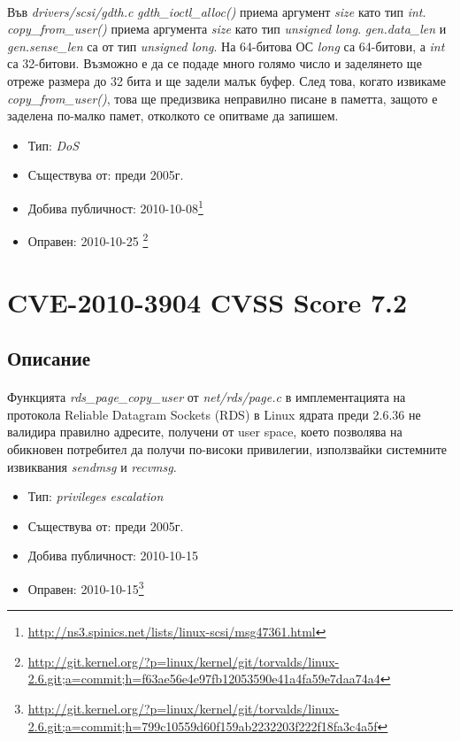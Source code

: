 \documentclass[a4paper,12pt,leqno]{article}
\begin{document}
\paragraph{}
Във \textit{drivers/scsi/gdth.c}
\textit{gdth\_ioctl\_alloc()} приема аргумент \textit{size} като тип \textit{int}.
\textit{copy\_from\_user()} приема аргумента \textit{size} като тип \textit{unsigned long}.
\textit{gen.data\_len} и \textit{gen.sense\_len} са от тип \textit{unsigned long}.
На 64-битова ОС \textit{long} са 64-битови, а \textit{int} са 32-битови.
Възможно е да се подаде много голямо число и заделянето ще отреже размера до 32 бита
и ще задели малък буфер. След това, когато извикаме \textit{copy\_from\_user()},
това ще предизвика неправилно писане в паметта, защото е заделена по-малко памет,
отколкото се опитваме да запишем.
\begin{itemize}
    \item Тип: \textit{DoS}
    \item Съществува от: преди 2005г.
  	\item Добива публичност: 2010-10-08\footnote{\url{http://ns3.spinics.net/lists/linux-scsi/msg47361.html}}
    \item Оправен: 2010-10-25 \footnote{\url{http://git.kernel.org/?p=linux/kernel/git/torvalds/linux-2.6.git;a=commit;h=f63ae56e4e97fb12053590e41a4fa59e7daa74a4}}
\end{itemize}





\section{CVE-2010-3904 CVSS Score 7.2}
\subsection{Описание}
\paragraph{}
Функцията \textit{rds\_page\_copy\_user} от  \textit{net/rds/page.c} в имплементацията на протокола Reliable Datagram Sockets (RDS) в Linux ядрата преди 2.6.36 не валидира правилно адресите, получени от user space, което позволява на обикновен потребител да получи по-високи привилегии, използвайки системните извиквания \textit{sendmsg} и \textit{recvmsg}.
\begin{itemize}
    \item Тип: \textit{privileges escalation}
    \item Съществува от: преди 2005г.
  	\item Добива публичност: 2010-10-15
    \item Оправен: 2010-10-15\footnote{\url{http://git.kernel.org/?p=linux/kernel/git/torvalds/linux-2.6.git;a=commit;h=799c10559d60f159ab2232203f222f18fa3c4a5f}}
\end{itemize}
\end{document}
